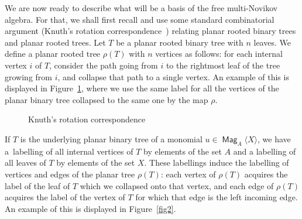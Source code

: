 \documentclass[10pt,a4paper]{article}
\theoremstyle{definition}
\numberwithin{equation}{section}
\numberwithin{figure}{section}
\DeclareMathOperator{\Mag}{\mathsf{Mag}}
\begin{document}
We are now ready to describe what will be a basis of the free multi-Novikov algebra. For that, we shall first recall and use some standard combinatorial argument (Knuth's rotation correspondence~\cite[Chapter~2.3]{Kn}) relating planar rooted binary trees and planar rooted trees. Let $T$ be a planar rooted binary tree with $n$ leaves. We define a planar rooted tree $\rho(T)$ with $n$ vertices as follows: for each internal vertex $i$ of $T$, consider the path going from $i$ to the rightmost leaf of the tree growing from $i$, and collapse that path to a single vertex. An example of this is displayed in Figure~\ref{fig1}, where we use the same label for all the vertices of the planar binary tree collapsed to the same one by the map $\rho$.
\begin{figure}[h]
\centering
{}
\caption{Knuth's rotation correspondence}\label{fig1}
\end{figure}

\goodbreak
If $T$ is the underlying planar binary tree of a monomial $u\in \Mag_A\langle X\rangle$, we have a~labelling of all internal vertices of $T$ by elements of the set $A$ and a labelling of all leaves of $T$ by elements of the set $X$. These labellings induce the labelling of vertices and edges of the planar tree $\rho(T)$: each vertex of $\rho(T)$ acquires the label of the leaf of $T$ which we collapsed onto that vertex, and each edge of $\rho(T)$ acquires the label of the vertex of $T$ for which that edge is the left incoming edge. An example of this is displayed in Figure~\ref{fig2}.
\end{document}

